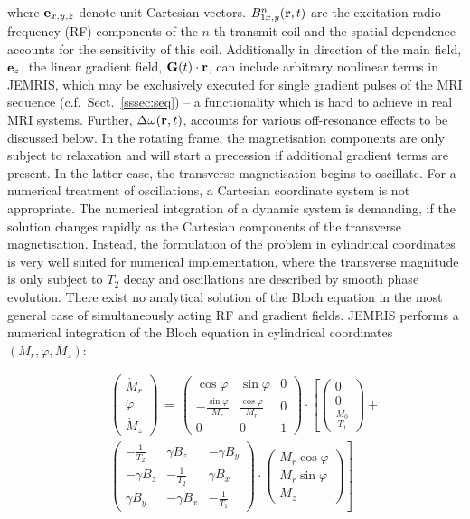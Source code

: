 \documentclass[journal,onecolumn,12pt]{IEEEtran}
\begin{document}
where ${\bf e}_{x,y,z}$ denote unit Cartesian vectors. $B_{1x,y}^n({\bf r},t)$ are the excitation radio-frequency (RF)
components of the $n$-th transmit coil and the spatial dependence accounts for the sensitivity of this
coil. Additionally in direction of the main field, ${\bf e}_z$, the linear gradient field, ${\bf G}(t)\cdot{\bf r}$, can
include arbitrary nonlinear terms in JEMRIS, which may be exclusively executed for single gradient pulses of the MRI
sequence (c.f.~Sect.~\ref{sssec:seq}) -- a functionality which is hard to achieve in real MRI systems. Further,
$\Delta\omega({\bf r},t)$, accounts for various off-resonance effects to be discussed below. In the rotating frame, the
magnetisation components are only subject to relaxation and will start a precession if additional gradient terms are
present. In the latter case, the transverse magnetisation begins to oscillate. For a numerical treatment of
oscillations, a Cartesian coordinate system is not appropriate. The numerical integration of a dynamic system is
demanding, if the solution changes rapidly as the Cartesian components of the transverse magnetisation. Instead, the
formulation of the problem in cylindrical coordinates is very well suited for numerical implementation, where the
transverse magnitude is only subject to $T_2$ decay and oscillations are described by smooth phase evolution. There
exist no analytical solution of the Bloch equation in the most general case of simultaneously acting RF and gradient
fields. JEMRIS performs a numerical integration of the Bloch equation in cylindrical coordinates $(M_r,\varphi,M_z)$:

\begin{eqnarray}
 && \left ( \begin{array}{c} \dot{M}_r \\ \dot{\varphi} \\ \dot{M}_z \end{array} \right ) \,=\,
 \left ( \begin{array}{ccc}
 \cos\varphi & \sin\varphi & 0 \\ -\frac{\sin\varphi}{M_r} & \frac{\cos\varphi}{M_r} & 0 \\ 0 & 0 & 1 
 \end{array} \right )\cdot \left[ \left ( \begin{array}{c} 0 \\ 0 \\ \frac{M_0}{T_1} \end{array} \right ) + \right. \nonumber \\
 &&  \left. \left ( \begin{array}{ccc} -\frac{1}{T_2} & \gamma B_z & -\gamma B_y \\
                             -\gamma B_z &-\frac{1}{T_2} &  \gamma B_x \\
			     \gamma B_y & -\gamma B_x &-\frac{1}{T_1} 
          \end{array} \right )
 \cdot \left ( \begin{array}{c} {M}_r\cos\varphi \\ {M}_r\sin\varphi \\ {M}_z \end{array} \right ) \right] \label{eq:bloch}
\end{eqnarray}
\end{document}
